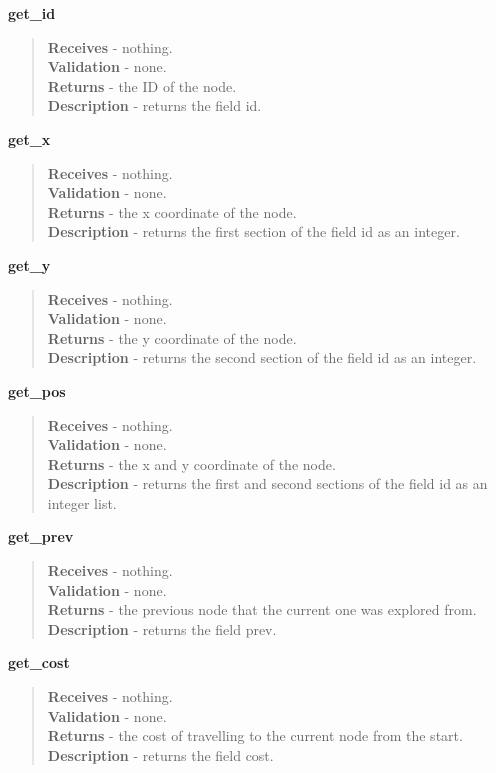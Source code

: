 \documentclass[titlepage]{article}
\begin{document}
\textbf{get\_id}
\begin{quote}
\textbf{Receives} - nothing. \\
\textbf{Validation} - none.\\
\textbf{Returns} - the ID of the node. \\
\textbf{Description} - returns the field id.
\end{quote}

\textbf{get\_x}
\begin{quote}
\textbf{Receives} - nothing. \\
\textbf{Validation} - none.\\
\textbf{Returns} - the x coordinate of the node. \\
\textbf{Description} - returns the first section of the field id as an integer.
\end{quote}

\textbf{get\_y}
\begin{quote}
\textbf{Receives} - nothing. \\
\textbf{Validation} - none.\\
\textbf{Returns} - the y coordinate of the node. \\
\textbf{Description} - returns the second section of the field id as an integer.
\end{quote}

\textbf{get\_pos}
\begin{quote}
\textbf{Receives} - nothing. \\
\textbf{Validation} - none.\\
\textbf{Returns} - the x and y coordinate of the node. \\
\textbf{Description} - returns the first and second sections of the field id as an integer list.
\end{quote}

\textbf{get\_prev}
\begin{quote}
\textbf{Receives} - nothing. \\
\textbf{Validation} - none.\\
\textbf{Returns} - the previous node that the current one was explored from. \\
\textbf{Description} - returns the field prev.
\end{quote}

\textbf{get\_cost}
\begin{quote}
\textbf{Receives} - nothing. \\
\textbf{Validation} - none.\\
\textbf{Returns} - the cost of travelling to the current node from the start. \\
\textbf{Description} - returns the field cost.
\end{quote}
\end{document}
